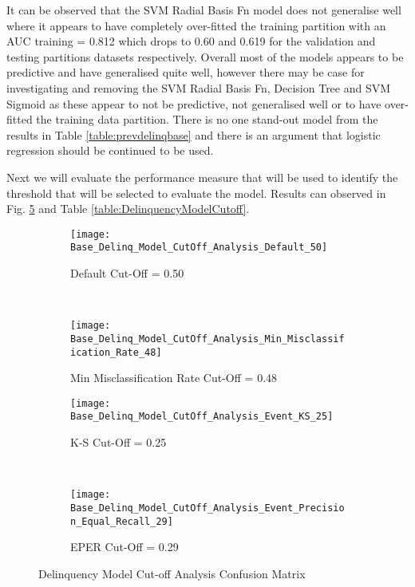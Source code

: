 It can be observed that the SVM Radial Basis Fn model does not generalise well where it appears to have completely over-fitted the training partition with an AUC training = 0.812 which drops to 0.60 and 0.619 for the validation and testing partitions datasets respectively. Overall most of the models appears to be predictive and have generalised quite well, however there may be case for investigating and removing the SVM Radial Basis Fn, Decision Tree and SVM Sigmoid as these appear to not be predictive, not generalised well or to have over-fitted the training data partition. There is no one stand-out model from the results in Table \ref{table:prevdelinqbase} and there is an argument that logistic regression should be continued to be used. 


Next we will evaluate the performance measure that will be used to identify the threshold that will be selected to evaluate the model. Results can observed in Fig. \ref{fig:Base_Delinq_Model_CutOff_Analysis} and Table \ref{table:DelinquencyModelCutoff}. 	

\begin{figure}[H]
	\centering
	\begin{subfigure}[b]{0.45\textwidth}
		\captionsetup{font=scriptsize}
		\texttt{[image: Base\_Delinq\_Model\_CutOff\_Analysis\_Default\_50]}\caption{Default Cut-Off = 0.50}\label{fig:Base_Delinq_Model_CutOff_Analysis_Default_50}
	\end{subfigure}  ~\quad
	\begin{subfigure}[b]{0.45\textwidth}
		\captionsetup{font=scriptsize}
		\texttt{[image: Base\_Delinq\_Model\_CutOff\_Analysis\_Min\_Misclassification\_Rate\_48]}
		\caption{Min Misclassification Rate Cut-Off = 0.48}\label{fig:Base_Delinq_Model_CutOff_Analysis_Min_Misclassification_Rate_54}
	\end{subfigure} 
	\medskip \newline
	\begin{subfigure}[b]{0.45\textwidth}
		\captionsetup{font=scriptsize}
		\texttt{[image: Base\_Delinq\_Model\_CutOff\_Analysis\_Event\_KS\_25]}
		\caption{K-S Cut-Off = 0.25}\label{fig:Base_Delinq_Model_CutOff_Analysis_Event_KS_25}
	\end{subfigure} ~\quad
	\begin{subfigure}[b]{0.45\textwidth}
		\captionsetup{font=scriptsize}
		\texttt{[image: Base\_Delinq\_Model\_CutOff\_Analysis\_Event\_Precision\_Equal\_Recall\_29]}
		\caption{EPER Cut-Off = 0.29}\label{fig:Base_Delinq_Model_CutOff_Analysis_Event_Precision_Equal_Recall_29}
	\end{subfigure}
	\caption{Delinquency Model Cut-off Analysis Confusion Matrix}
	\label{fig:Base_Delinq_Model_CutOff_Analysis}
\end{figure}

